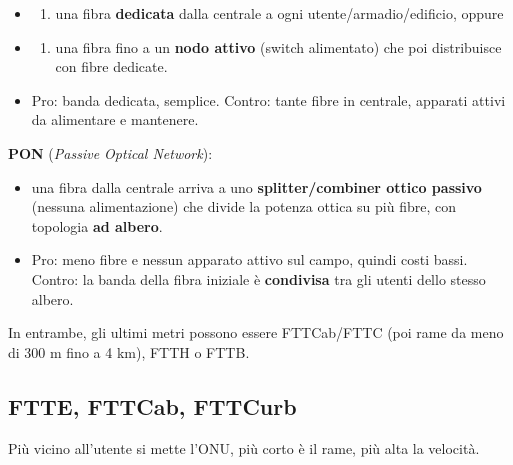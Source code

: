 \begin{itemize}
\item
  \begin{enumerate}
  \def\labelenumi{(\alph{enumi})}
  \tightlist
  \item
    una fibra \textbf{dedicata} dalla centrale a ogni utente/armadio/edificio, oppure
  \end{enumerate}
\item
  \begin{enumerate}
  \def\labelenumi{(\alph{enumi})}
  \setcounter{enumi}{1}
  \tightlist
  \item
    una fibra fino a un \textbf{nodo attivo} (switch alimentato) che poi distribuisce con fibre dedicate.
  \end{enumerate}
\item
  Pro: banda dedicata, semplice. Contro: tante fibre in centrale, apparati attivi da alimentare e mantenere.
\end{itemize}

\textbf{PON} (\emph{Passive Optical Network}):

\begin{itemize}
\tightlist
\item
  una fibra dalla centrale arriva a uno \textbf{splitter/combiner ottico passivo} (nessuna alimentazione) che divide la potenza ottica su più fibre, con topologia \textbf{ad albero}.
\item
  Pro: meno fibre e nessun apparato attivo sul campo, quindi costi bassi. Contro: la banda della fibra iniziale è \textbf{condivisa} tra gli utenti dello stesso albero.
\end{itemize}

In entrambe, gli ultimi metri possono essere FTTCab/FTTC (poi rame da meno di 300 m fino a 4 km), FTTH o FTTB.

\subsection{FTTE, FTTCab, FTTCurb}

\begin{inbreve}

Più vicino all'utente si mette l'ONU, più corto è il rame, più alta la velocità.

\end{inbreve}

